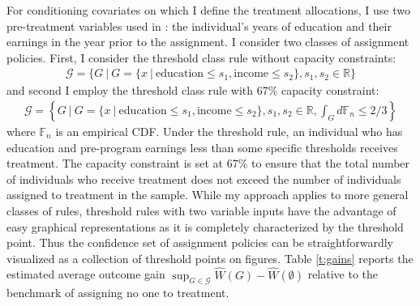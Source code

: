 \documentclass[12pt,oneside,reqno,english]{amsart}
\theoremstyle{definition}
\begin{document}
For conditioning covariates on which I define the treatment allocations, I use two pre-treatment variables used in \cite{KT:18}: 
the individual's years of education and their earnings in the year prior to the assignment.
I consider two classes of assignment policies. First, I consider the threshold class rule without capacity constraints:
\begin{align*}
\mathcal{G}=\{G\ | \ G=\{x \ | \ \mbox{education}\leq s_{1}, \mbox{income}\leq s_{2}\}, s_{1},s_{2}\in \mathbb{R} \}
\end{align*}
and second I employ the threshold class rule with 67\% capacity constraint:
\begin{align*}
\mathcal{G}=\left\{G\ | \ G=\{x \ | \ \mbox{education}\leq s_{1}, \mbox{income}\leq s_{2}\}, s_{1},s_{2}\in \mathbb{R}, \int_{G}d\mathbb{F}_{n}\leq 2/3 \right\}
\end{align*}
where $\mathbb{F}_{n}$ is an empirical CDF. Under the threshold rule, an individual who has 
education and pre-program earnings less than some specific thresholds receives treatment. The capacity constraint is set at 67\% to ensure that the total number of individuals who receive treatment does not exceed the number of individuals assigned to treatment in the sample. 
While my approach applies to more general classes of rules, threshold rules with two variable inputs have the advantage of easy graphical representations as it is completely characterized by the threshold point. Thus the confidence set of assignment policies can be straightforwardly visualized as a collection of threshold points on figures. Table \ref{t:gains} reports the estimated average outcome gain $\sup_{G\in\mathcal{G}}\hat{W}(G)-\hat{W}(\emptyset)$ relative to the benchmark of assigning no one to treatment. 
\end{document}
